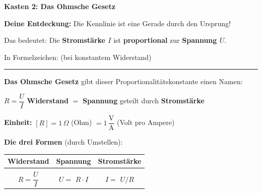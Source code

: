 \documentclass[11pt, a4paper]{article}
\newcommand{\loes}[1]{\textcolor{loesung}{\textbf{#1}}}
\begin{document}

\newpage


\begin{merkkasten}
\textbf{Kasten 2: Das Ohmsche Gesetz}

\vspace{0.4em}
\textbf{Deine Entdeckung:} Die Kennlinie ist eine Gerade durch den Ursprung!

\vspace{0.3em}
Das bedeutet: Die \loes{Stromstärke $I$} ist \textbf{proportional} zur \loes{Spannung $U$}.

\vspace{0.3em}
In Formelzeichen: \hspace{1em}  \hspace{1em} (bei konstantem Widerstand)

\vspace{0.6em}
\hrule
\vspace{0.6em}

\textbf{Das Ohmsche Gesetz} gibt dieser Proportionalitätskonstante einen Namen:

\begin{formelkasten}
\begin{center}
\large
$R = \dfrac{U}{I}$ \hspace{2cm} \textbf{Widerstand} $=$ \textbf{Spannung} geteilt durch \textbf{Stromstärke}
\end{center}
\end{formelkasten}

\vspace{0.3em}
\textbf{Einheit:} $[R] = 1\,\Omega$ (Ohm) $= 1\,\dfrac{\text{V}}{\text{A}}$ (Volt pro Ampere)

\vspace{0.6em}
\textbf{Die drei Formen} (durch Umstellen):

\vspace{0.3em}
\begin{center}
\begin{tabular}{|c|c|c|}
\hline
\textbf{Widerstand} & \textbf{Spannung} & \textbf{Stromstärke} \\[0.3em]
\hline
& & \\[0.3em]
$R = \dfrac{U}{I}$ & $U = $ \loes{$R \cdot I$} & $I = $ \loes{$U / R$} \\[0.8em]
\hline
\end{tabular}
\end{center}


\end{merkkasten}
\end{document}
